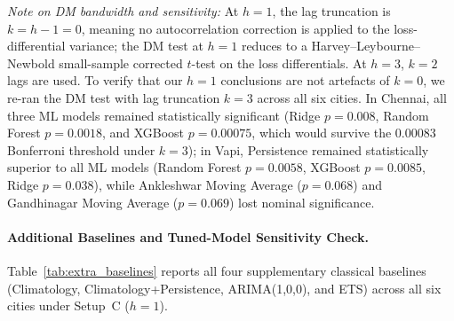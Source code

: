 \textit{Note on DM bandwidth and sensitivity:} At $h=1$, the lag truncation is $k = h - 1 = 0$, meaning no autocorrelation correction is applied to the loss-differential variance; the DM test at $h=1$ reduces to a Harvey--Leybourne--Newbold small-sample corrected $t$-test on the loss differentials. At $h=3$, $k=2$ lags are used. To verify that our $h=1$ conclusions are not artefacts of $k=0$, we re-ran the DM test with lag truncation $k=3$ across all six cities. In Chennai, all three ML models remained statistically significant (Ridge $p = 0.008$, Random Forest $p = 0.0018$, and XGBoost $p = 0.00075$, which would survive the 0.00083 Bonferroni threshold under $k=3$); in Vapi, Persistence remained statistically superior to all ML models (Random Forest $p = 0.0058$, XGBoost $p = 0.0085$, Ridge $p = 0.038$), while Ankleshwar Moving Average ($p = 0.068$) and Gandhinagar Moving Average ($p = 0.069$) lost nominal significance.

\paragraph{Additional Baselines and Tuned-Model Sensitivity Check.}
Table~\ref{tab:extra_baselines} reports all four supplementary classical baselines (Climatology, Climatology+Persistence, ARIMA(1,0,0), and ETS) across all six cities under Setup~C ($h=1$).



